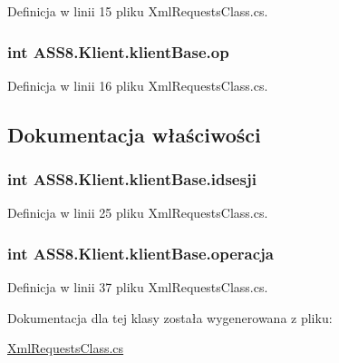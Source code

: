 Definicja w linii 15 pliku XmlRequestsClass.cs.\hypertarget{a00007_b11ab72b0ec00711ba94090856560218}{
\subsubsection[{op}]{\setlength{\rightskip}{0pt plus 5cm}int {\bf ASS8.Klient.klientBase.op}}}
\label{de/d5e/a00007_b11ab72b0ec00711ba94090856560218}




Definicja w linii 16 pliku XmlRequestsClass.cs.

\subsection{Dokumentacja właściwości}
\hypertarget{a00007_10f9e496d18b642305c5b7abf472f355}{
\subsubsection[{idsesji}]{\setlength{\rightskip}{0pt plus 5cm}int ASS8.Klient.klientBase.idsesji}}
\label{de/d5e/a00007_10f9e496d18b642305c5b7abf472f355}




Definicja w linii 25 pliku XmlRequestsClass.cs.\hypertarget{a00007_fe6646ec940736ab25958681a9044b7f}{
\subsubsection[{operacja}]{\setlength{\rightskip}{0pt plus 5cm}int ASS8.Klient.klientBase.operacja}}
\label{de/d5e/a00007_fe6646ec940736ab25958681a9044b7f}




Definicja w linii 37 pliku XmlRequestsClass.cs.

Dokumentacja dla tej klasy została wygenerowana z pliku:\begin{CompactItemize}
\item 
\hyperlink{a00055}{XmlRequestsClass.cs}\end{CompactItemize}
